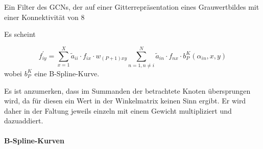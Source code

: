 Ein Filter des \glspl{GCN}, der auf einer Gitterrepräsentation eines Grauwertbildes mit einer Konnektivität von $8$




Es scheint




\begin{equation}
  f^{\prime}_{iy} = \sum_{x = 1}^X \tilde a_{ii} \cdot f_{ix} \cdot w_{\left(P +1\right)xy} \sum_{n = 1, n \neq i}^N \tilde a_{in} \cdot f_{nx} \cdot b^K_P\left(\alpha_{in}, x, y\right)
\end{equation}
wobei $b_P^K$ eine B-Spline-Kurve.

Es ist anzumerken, dass im Summanden der betrachtete Knoten übersprungen wird, da für diesen ein Wert in der Winkelmatrix keinen Sinn ergibt.
Er wird daher in der Faltung jeweils einzeln mit einem Gewicht multipliziert und dazuaddiert.

\paragraph{B-Spline-Kurven}
\label{bspline}

